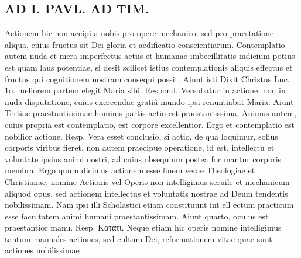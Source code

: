 \documentclass{article}
\begin{document}
\begin{pages}
\section*{AD I. PAVL. AD TIM. }
\marginpar{[ p.14 ]}\pstart Actionem hic non accipi a nobis pro opere mechanico: sed pro praestatione aliqua, cuius fructus sit Dei gloria et aedificatio conscientiarum. Contemplatio autem nuda et mera imperfectus actus et humanae imbecillitatis indicium potius est quam laus potentiae, si desit scilicet istius contemplationis aliquis effectus et fructus qui cognitionem nostram consequi possit. Aiunt isti Dixit Christus Luc. 1o. meliorem partem elegit Maria sibi. Respond. Versabatur in actione, non in nuda disputatione, cuius exercendae gratiâ mundo ipsi renuntiabat Maria. Aiunt Tertiae praestantissimae hominis partis actio est praestantissima. Animus autem, cuius propria est contemplatio, est corpore excellentior. Ergo et contemplatio est nobilior actione. Resp. Vera esset conclusio, si actio, de qua loquimur, solius corporis viribus fieret, non autem praecipue operatione, id est, intellectu et voluntate ipsius animi nostri, ad cuius obsequium postea for mantur corporis membra. Ergo quum dicimus actionem esse finem verae Theologiae et Christianae, nomine Actionis vel Operis non intelligimus seruile et mechanicum aliquod opus, sed actionem intellectus et voluntatis nostrae ad Deum tendentis nobilissimam. Nam ipsi illi Scholastici etiam constituunt int ell ectum practicum esse facultatem animi humani praestantissimam. Aiunt quarto, oculus est praestantior manu. Resp. Κατάτι. Neque etiam hic operis nomine intelligimus tantum manuales actiones, sed cultum Dei, reformationem vitae quae sunt actiones nobilissimae  \pend

\end{pages}
\end{document}
